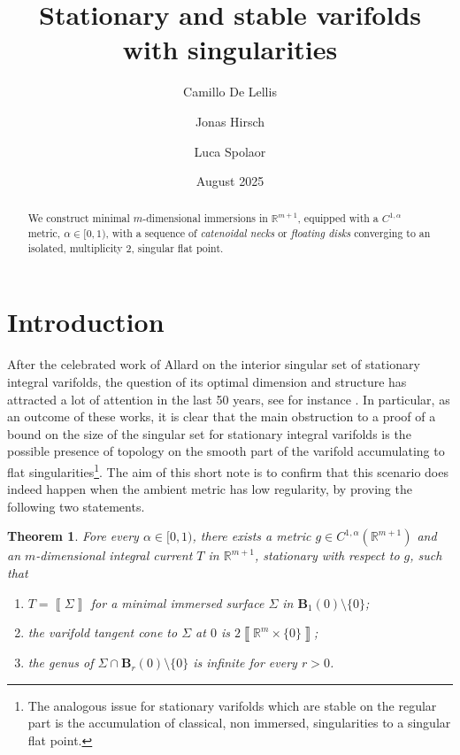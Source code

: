 \documentclass[reqno]{amsart}
\title{Stationary and stable varifolds with singularities}
\author[C. De Lellis]{Camillo De Lellis}
\author[J. Hirsch]{Jonas Hirsch}
\author[L. Spolaor]{Luca Spolaor}
\date{August 2025}
\newtheorem{theorem}{Theorem}[section]
\theoremstyle{definition}
\theoremstyle{remark}
\numberwithin{equation}{section}
\newcommand{\R}{\mathbb{R}}
\def\a#1{\left\llbracket{#1}\right\rrbracket}
\begin{document}
\begin{abstract}
We construct minimal $m$-dimensional immersions in $\R^{m+1}$, equipped with a $C^{1, \alpha}$ metric, $\alpha\in [0,1)$, with a sequence of \emph{catenoidal necks} or \emph{floating disks} converging to an isolated, multiplicity $2$, singular flat point. 
\end{abstract}


\maketitle




\section{Introduction}


After the celebrated work of Allard \cite{All} on the interior singular set of stationary integral varifolds, the question of its optimal dimension and structure has attracted a lot of attention in the last 50 years, see for instance \cite{BMW,Brakke, BDF,  CCSvarifolds,DelellisAllard, DPGS,HirschSpolaor2024, HS, MenneJGA, SavinAllard,SW}. In particular, as an outcome of these works, it is clear that the main obstruction to a proof of a bound on the size of the singular set for stationary integral varifolds is the possible presence of topology on the smooth part of the varifold accumulating to flat singularities\footnote{The analogous issue for stationary varifolds which are stable on the regular part is the accumulation of classical, non immersed, singularities to a singular flat point.}. The aim of this short note is to confirm that this scenario does indeed happen when the ambient metric has low regularity, by proving the following two statements.



\begin{theorem}\label{t:uno} Fore every $\alpha \in [0,1)$, there exists a metric $g\in C^{1,\alpha}(\R^{m+1})$ and an $m$-dimensional integral current $T$ in $\R^{m+1}$, stationary with respect to $g$, such that 
\begin{enumerate}
    \item $T=\a{\Sigma}$ for a minimal immersed surface $\Sigma$ in $\mathbf{B}_1 (0) \setminus \{0\}$;
    \item the varifold tangent cone to $\Sigma$ at $0$ is $2 \a{\R^m\times \{0\}}$;
    \item the genus of $\Sigma \cap \mathbf{B}_r (0)\setminus \{0\}$ is infinite for every $r>0$.
\end{enumerate}
\end{theorem}
\end{document}
